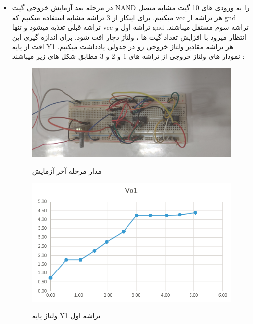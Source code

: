 \documentclass[twoside]{article}
\begin{document}
\begin{itemize}
		\newpage
		\item
		در مرحله بعد آزمایش خروجی گیت NAND را به ورودی های 10 گیت مشابه متصل میکنیم. برای اینکار از 3 تراشه مشابه استفاده میکنیم که vcc هر تراشه از gnd تراشه قبلی تغذیه میشود و تنها vcc تراشه اول و gnd تراشه سوم مستقل میباشند. انتظار میرود با افزایش تعداد گیت ها ، ولتاژ دچار افت شود. برای اندازه گیری این افت از پایه Y1 هر تراشه مقادیر ولتاژ خروجی رو در جدولی یادداشت میکنیم. نمودار های ولتاژ خروجی  از تراشه های 1 و 2 و 3 مطابق شکل های زیر میباشند :
		\begin{figure}[h!]
			\begin{center}
				\includegraphics[scale=0.075]{last_madar}‎
				\caption{مدار مرحله آخر آزمایش}
			\end{center}
		\end{figure} 
	
			\begin{figure}[h!]
		\begin{center}
			\includegraphics[scale=0.75]{nemoodar3}‎
			\caption{ولتاژ پایه Y1 تراشه اول}
		\end{center}
	\end{figure} 


\end{itemize}
\end{document}
